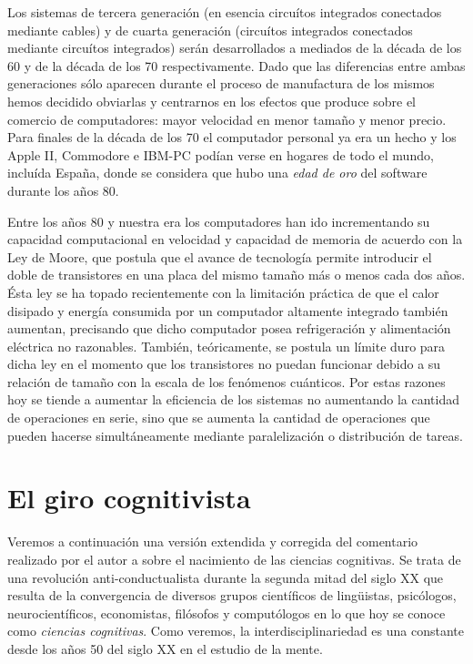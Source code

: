 \documentclass[12pt]{memoir}
\begin{document}
\begin{appendices}
Los sistemas de tercera generación (en esencia circuítos integrados conectados mediante cables) y de cuarta generación (circuítos integrados conectados mediante circuítos integrados) serán desarrollados a mediados de la década de los 60 y de la década de los 70 respectivamente. Dado que las diferencias entre ambas generaciones sólo aparecen durante el proceso de manufactura de los mismos hemos decidido obviarlas y centrarnos en los efectos que produce sobre el comercio de computadores: mayor velocidad en menor tamaño y menor precio. Para finales de la década de los 70 el computador personal ya era un hecho y los Apple II, Commodore e IBM-PC podían verse en hogares de todo el mundo, incluída España, donde se considera que hubo una \textit{edad de oro} del software durante los años 80.

Entre los años 80 y nuestra era los computadores han ido incrementando su capacidad computacional en velocidad y capacidad de memoria de acuerdo con la Ley de Moore, que postula que el avance de tecnología permite introducir el doble de transistores en una placa del mismo tamaño más o menos cada dos años. Ésta ley se ha topado recientemente con la limitación práctica de que el calor disipado y energía consumida por un computador altamente integrado también aumentan, precisando que dicho computador posea refrigeración y alimentación eléctrica no razonables. También, teóricamente, se postula un límite duro para dicha ley en el momento que los transistores no puedan funcionar debido a su relación de tamaño con la escala de los fenómenos cuánticos. Por estas razones hoy se tiende a aumentar la eficiencia de los sistemas no aumentando la cantidad de operaciones en serie, sino que se aumenta la cantidad de operaciones que pueden hacerse simultáneamente mediante paralelización o distribución de tareas.

\chapter{El giro cognitivista}
\label{cognitiveHistory}

Veremos a continuación una versión extendida y corregida del comentario realizado por el autor a \parencite{pmf07} sobre el nacimiento de las ciencias cognitivas. Se trata de una revolución anti-conductualista durante la segunda mitad del siglo XX \parencite{theCognitiveRevolution} que resulta de la convergencia de diversos grupos científicos de lingüistas, psicólogos, neurocientíficos, economistas, filósofos y computólogos en lo que hoy se conoce como \textit{ciencias cognitivas}. Como veremos, la interdisciplinariedad es una constante desde los años 50 del siglo XX en el estudio de la mente.


\end{appendices}
\end{document}
